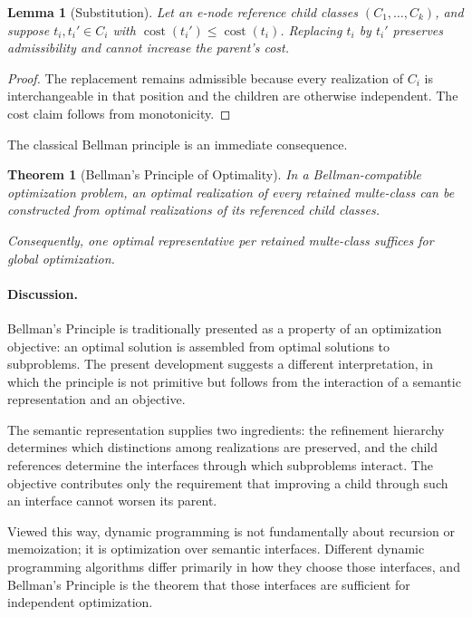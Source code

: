 \documentclass[sigconf,nonacm]{acmart}
\theoremstyle{definition}
\theoremstyle{plain}
\newtheorem{theorem}[definition]{Theorem}
\newtheorem{lemma}[definition]{Lemma}
\theoremstyle{remark}
\begin{document}
\begin{lemma}[Substitution]
Let an e-node reference child classes \((C_1,\ldots,C_k)\),
and suppose \(t_i,t_i'\in C_i\) with
\(\operatorname{cost}(t_i') \le \operatorname{cost}(t_i)\).
Replacing \(t_i\) by \(t_i'\) preserves admissibility and cannot
increase the parent's cost.
\end{lemma}

\begin{proof}
The replacement remains admissible because every realization of
\(C_i\) is interchangeable in that position and the children are
otherwise independent.  The cost claim follows from monotonicity.
\end{proof}

The classical Bellman principle is an immediate consequence.

\begin{theorem}[Bellman's Principle of Optimality]

In a Bellman-compatible optimization problem, an optimal realization of
every retained multe-class can be constructed from optimal realizations
of its referenced child classes.

Consequently, one optimal representative per retained multe-class
suffices for global optimization.

\end{theorem}

\paragraph{Discussion.}

Bellman's Principle is traditionally presented as a property of an
optimization objective: an optimal solution is assembled from optimal
solutions to subproblems.  The present development suggests a different
interpretation, in which the principle is not primitive but follows
from the interaction of a semantic representation and an objective.

The semantic representation supplies two ingredients: the refinement
hierarchy determines which distinctions among realizations are
preserved, and the child references determine the interfaces through
which subproblems interact.  The objective contributes only the
requirement that improving a child through such an interface cannot
worsen its parent.

Viewed this way, dynamic programming is not fundamentally about
recursion or memoization; it is optimization over semantic interfaces.
Different dynamic programming algorithms differ primarily in how they
choose those interfaces, and Bellman's Principle is the theorem that
those interfaces are sufficient for independent optimization.
\end{document}
